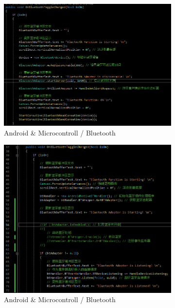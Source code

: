 \documentclass[a4paper,10pt]{article}
\begin{document}
		\begin{figure}[htbp] 
			\centering 
			\begin{subfigure}{0.545\textwidth}
				\includegraphics[width=\linewidth]{picture/btlibrary}
				\captionsetup{font=scriptsize}
				\caption{Android \& Microcontroll / Bluetooth}
				\label{fig:btlibrary}
			\end{subfigure}
			\begin{subfigure}{0.448\textwidth}
				\includegraphics[width=\linewidth]{picture/NativeBT}
				\captionsetup{font=scriptsize}
				\caption{Android \& Microcontroll / Bluetooth}
				\label{fig:nativebt}
			\end{subfigure}
			\caption{			
			}
		\end{figure}
		
\end{document}
